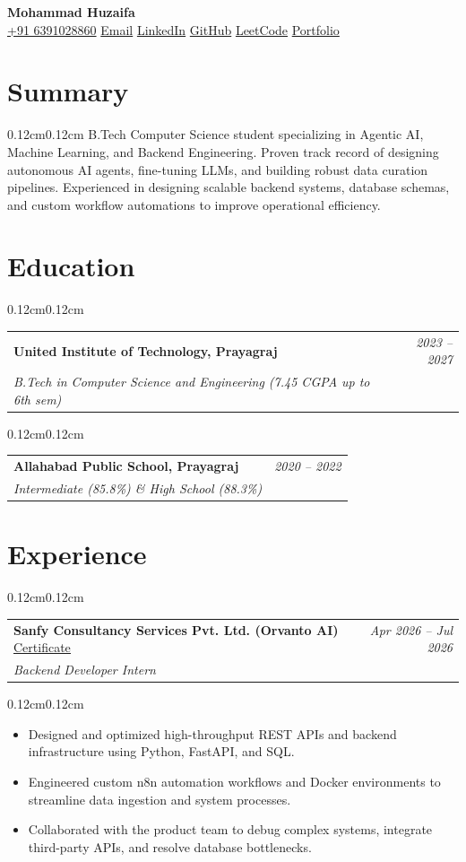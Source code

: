 \documentclass[10pt, letterpaper]{article}
\makeatletter
\newenvironment{onecolentry}
{\begin{adjustwidth}{0.12cm}{0.12cm}}
{\end{adjustwidth}}
\newenvironment{twocolentry}
{\begin{adjustwidth}{0.12cm}{0.12cm}
\begin{tabular*}{\linewidth}{l @{\extracolsep{\fill}} r}}
{\end{tabular*}
\end{adjustwidth}}
\newenvironment{highlights}
{\begin{itemize}[leftmargin=0.36cm, itemsep=0pt, topsep=1pt]}
{\end{itemize}}
\newcommand{\resumeheader}{
\vspace*{0.05cm}
{\centering
{\fontsize{17pt}{17pt}\selectfont \textbf{Mohammad Huzaifa}}\\
\vspace{3pt}
\href{tel:+916391028860}{+91 6391028860} \quad
\href{mailto:mdhuzaifa00786@gmail.com}{Email} \quad
\href{https://www.linkedin.com/in/mohammad--huzaifa/}{LinkedIn} \quad
\href{https://github.com/GuruMachanica}{GitHub} \quad
\href{https://leetcode.com/u/mohammad-huzaifa-}{LeetCode} \quad
\href{https://mohammad-huzaifa.vercel.app/}{Portfolio}
\par}
\vspace{0.1cm}
}
\makeatother
\begin{document}
\resumeheader

\section{Summary}
\begin{onecolentry}
B.Tech Computer Science student specializing in Agentic AI, Machine Learning, and Backend Engineering. Proven track record of designing autonomous AI agents, fine-tuning LLMs, and building robust data curation pipelines. Experienced in designing scalable backend systems, database schemas, and custom workflow automations to improve operational efficiency.
\end{onecolentry}

\section{Education}

\begin{twocolentry}
\textbf{United Institute of Technology, Prayagraj} & \textit{2023 – 2027} \\
\textit{B.Tech in Computer Science and Engineering (7.45 CGPA up to 6th sem)} &
\end{twocolentry}

\vspace{2.5pt}

\begin{twocolentry}
\textbf{Allahabad Public School, Prayagraj} & \textit{2020 – 2022} \\
\textit{Intermediate (85.8\%) \& High School (88.3\%)} &
\end{twocolentry}

\section{Experience}

\begin{twocolentry}
\textbf{Sanfy Consultancy Services Pvt. Ltd. (Orvanto AI)} \quad \href{https://drive.google.com/file/d/100xwhMZa1ViRXZRXDTFmYDMBq3LtKmt4/view?usp=sharing}{\underline{Certificate}} & \textit{Apr 2026 – Jul 2026} \\
\textit{Backend Developer Intern} &
\end{twocolentry}
\begin{onecolentry}
\begin{highlights}
\item Designed and optimized high-throughput REST APIs and backend infrastructure using Python, FastAPI, and SQL.
\item Engineered custom n8n automation workflows and Docker environments to streamline data ingestion and system processes.
\item Collaborated with the product team to debug complex systems, integrate third-party APIs, and resolve database bottlenecks.
\end{highlights}
\end{onecolentry}
\end{document}
